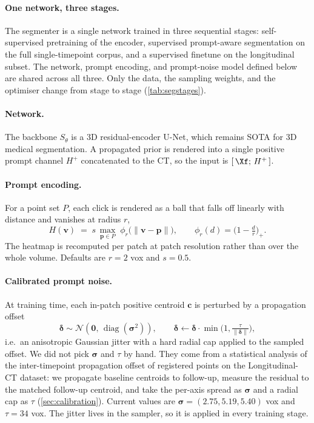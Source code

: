 \paragraph{One network, three stages.} The segmenter is a single network trained
in three sequential stages: self-supervised pretraining of the encoder, supervised
prompt-aware segmentation on the full single-timepoint corpus, and a supervised
finetune on the longitudinal subset. The network, prompt encoding, and prompt-noise
model defined below are shared across all three. Only the data, the sampling
weights, and the optimiser change from stage to stage (\cref{tab:segstages}).
 
\paragraph{Network.} The backbone $S_\theta$ is a 3D residual-encoder U-Net, which remains SOTA for 3D medical segmentation.
 A propagated prior is rendered into a single positive prompt channel
$H^{+}$ concatenated to the CT, so the input is $[\,\Xf;\,H^{+}\,]$.
 
\paragraph{Prompt encoding.} For a point set $P$, each click is rendered as a ball
that falls off linearly with distance and vanishes at radius $r$,
\begin{equation}
H(\bm v)\;=\;s\,\max_{\bm p\in P}\;\phi_r\!\big(\lVert \bm v-\bm p\rVert\big),
\qquad
\phi_r(d)=\Big(1-\tfrac{d}{r}\Big)_{+}.
\label{eq:heatmap}
\end{equation}
The heatmap is recomputed per patch at patch resolution rather than over the whole
volume. Defaults are $r=2$ vox and $s=0.5$.
 
\paragraph{Calibrated prompt noise.} At training time, each in-patch positive
centroid $\bm c$ is perturbed by a propagation offset
\begin{equation}
\bm\delta\sim\mathcal{N}(\bm 0,\,\operatorname{diag}(\bm\sigma^2)),
\qquad
\bm\delta \leftarrow \bm\delta\cdot\min\!\Big(1,\tfrac{\tau}{\lVert\bm\delta\rVert}\Big),
\label{eq:offset}
\end{equation}
i.e.\ an anisotropic Gaussian jitter with a hard radial cap applied to the sampled
offset. We did not pick $\bm\sigma$ and $\tau$ by hand. They come from a
statistical analysis of the inter-timepoint propagation offset of registered points
on the Longitudinal-CT dataset: we
propagate baseline centroids to follow-up, measure the residual to the matched
follow-up centroid, and take the per-axis spread as $\bm\sigma$ and a radial cap as
$\tau$ (\cref{sec:calibration}). Current values are $\bm\sigma=(2.75,5.19,5.40)$ vox
and $\tau=34$ vox. The jitter lives in the sampler, so it is applied in every
training stage.
 

